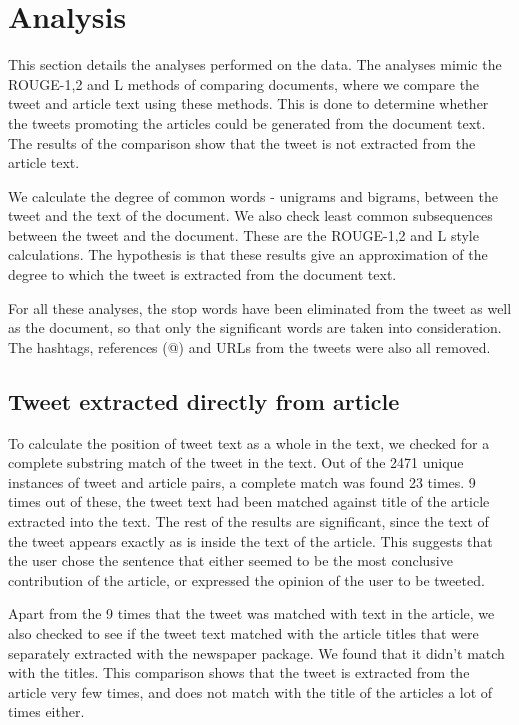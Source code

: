 \section{Analysis}
\label{sec:analysis}

This section details the analyses performed on the data. The analyses mimic the ROUGE-1,2 and L methods of comparing documents, where we compare the tweet and article text using these methods. This is done to determine whether the tweets promoting the articles could be generated from the document text. The results of the comparison show that the tweet is not extracted from the article text. 

We calculate the degree of common words - unigrams and bigrams, between the tweet and the text of the document. We also check least common subsequences between the tweet and the document. These are the ROUGE-1,2 and L style calculations. The hypothesis is that these results give an approximation of the degree to which the tweet is extracted from the document text. 

For all these analyses, the stop words have been eliminated from the tweet as well as the document, so that only the significant words are taken into consideration. The hashtags, references (@) and URLs from the tweets were also all removed.

\subsection {Tweet extracted directly from article}
To calculate the position of tweet text as a whole in the text, we checked for a complete substring match of the tweet in the text. Out of the 2471 unique instances of tweet and article pairs, a complete match was found 23 times. 9 times out of these, the tweet text had been matched against title of the article extracted into the text. The rest of the results are significant, since the text of the tweet appears exactly as is inside the text of the article. This suggests that the user chose the sentence that either seemed to be the most conclusive contribution of the article, or expressed the opinion of the user to be tweeted.

Apart from the 9 times that the tweet was matched with text in the article, we also checked to see if the tweet text matched with the article titles that were separately extracted with the newspaper package. We found that it didn't match with the titles. This comparison shows that the tweet is extracted from the article very few times, and does not match with the title of the articles a lot of times either. 

